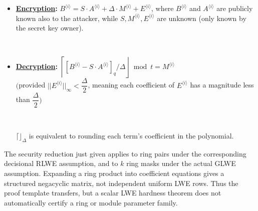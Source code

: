 \begin{tcolorbox}[title={\textbf{\tboxlabel{\ref*{subsec:lattice-scheme2}} Lattice-based RLWE Cryptosystem}}]
\begin{itemize}
    \item \textbf{\underline{Encryption}: } $B^{\langle i \rangle} = S \cdot A^{\langle i \rangle} + \Delta \cdot M^{\langle i \rangle} + E^{\langle i \rangle}$, where $B^{\langle i \rangle}$ and $A^{\langle i \rangle}$ are publicly known also to the attacker, while $S, M^{\langle i \rangle}, E^{\langle i \rangle}$ are unknown (only known by the secret key owner). 

    $ $
    
    \item \textbf{\underline{Decryption}: } $\left\lceil [B^{\langle i\rangle}-S\cdot A^{\langle i\rangle}]_q/\Delta\right\rfloor\bmod t=M^{\langle i\rangle}$ \\$\Big($provided $||E^{\langle i \rangle}||_{\infty} < \dfrac{\Delta}{2}$, meaning each coefficient of $E^{\langle i \rangle}$ has a magnitude less than $\dfrac{\Delta}{2}\Big)$

    $ $

    $\lceil  \rfloor_{\Delta}$ is equivalent to rounding each term's coefficient in the polynomial. 

\end{itemize}



\end{tcolorbox}

The security reduction just given applies to ring pairs under the corresponding decisional RLWE assumption, and to $k$ ring masks under the actual GLWE assumption. Expanding a ring product into coefficient equations gives a structured negacyclic matrix, not independent uniform LWE rows. Thus the proof template transfers, but a scalar LWE hardness theorem does not automatically certify a ring or module parameter family.
